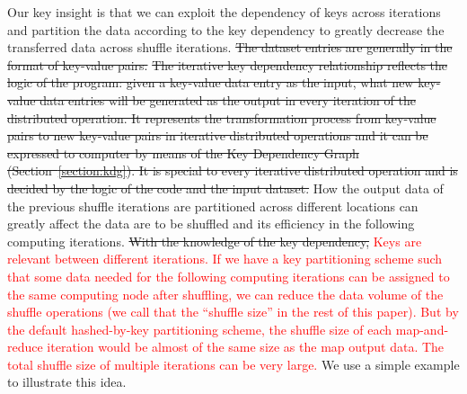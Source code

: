 \documentclass[10pt,journal,compsoc]{IEEEtran}
\newcommand{\blue}[1]{\textcolor{blue}{#1}}
\newcommand{\red}[1]{\textcolor{red}{#1}}
\begin{document}
Our key insight is that we can exploit the dependency of keys across iterations
and partition the data according to the key dependency to greatly decrease 
the transferred data across shuffle iterations.
\st{The dataset entries are generally in the format of key-value pairs. }
\st{
The iterative key dependency relationship reflects the logic of the program:
given a key-value data entry as the input, 
what new key-value data entries will be generated as the output in every iteration
of the distributed operation. 
It represents the transformation process from key-value pairs to new key-value pairs in iterative distributed operations
and it can be expressed to computer by means of the Key Dependency Graph (Section~\ref{section:kdg}). It is special to every iterative distributed operation
and is decided by the logic of the code and the input dataset. 
}
How the output data of the
previous shuffle iterations are partitioned across different locations
can greatly affect the data are to be
shuffled and its efficiency in the following computing iterations.
\st{With the knowledge of the key dependency,}
\red{
Keys are relevant between different iterations.
If we have a key partitioning scheme such that some data needed for the
following computing iterations can be assigned to the same computing
node after shuffling, we can reduce
the data volume of the shuffle operations (we call that the
``shuffle size'' in the rest of this paper). 
But by the default hashed-by-key partitioning scheme, the shuffle size of
each map-and-reduce iteration would be almost of the same size as the
map output data. The total shuffle size of multiple iterations
can be very large.
}
We use a simple example to
illustrate this idea.
\end{document}
